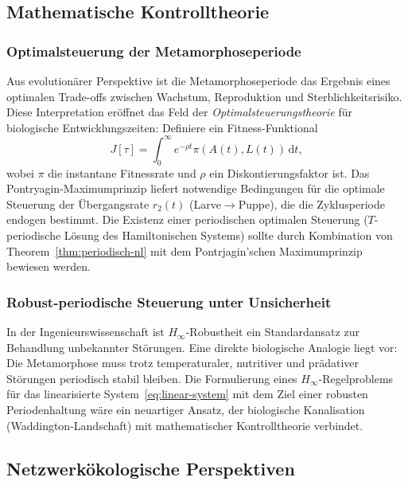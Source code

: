 ﻿\documentclass[12pt, a4paper]{article}
\theoremstyle{definition}
\newcommand{\dd}{\mathrm{d}}
\begin{document}
\subsection{Mathematische Kontrolltheorie}

\subsubsection{Optimalsteuerung der Metamorphoseperiode}
Aus evolutionärer Perspektive ist die Metamorphoseperiode das Ergebnis eines
optimalen Trade-offs zwischen Wachstum, Reproduktion und Sterblichkeitsrisiko.
Diese Interpretation eröffnet das Feld der \emph{Optimalsteuerungstheorie} für
biologische Entwicklungszeiten: Definiere ein Fitness-Funktional
\[
  J[\tau] = \int_0^\infty e^{-\rho t} \pi(A(t), L(t))\,\dd t,
\]
wobei $\pi$ die instantane Fitnessrate und $\rho$ ein Diskontierungsfaktor ist.
Das Pontryagin-Maximumprinzip liefert notwendige Bedingungen für die optimale
Steuerung der Übergangsrate $r_2(t)$ (Larve$\to$Puppe), die die Zyklusperiode
endogen bestimmt. Die Existenz einer periodischen optimalen Steuerung ($T$-periodische
Lösung des Hamiltonischen Systems) sollte durch Kombination von Theorem~\ref{thm:periodisch-nl}
mit dem Pontrjagin'schen Maximumprinzip bewiesen werden.

\subsubsection{Robust-periodische Steuerung unter Unsicherheit}
In der Ingenieurswissenschaft ist $H_\infty$-Robustheit ein Standardansatz zur
Behandlung unbekannter Störungen. Eine direkte biologische Analogie liegt vor:
Die Metamorphose muss trotz temperaturaler, nutritiver und prädativer Störungen
periodisch stabil bleiben. Die Formulierung eines $H_\infty$-Regelproblems für
das linearisierte System~\eqref{eq:linear-system} mit dem Ziel einer
robusten Periodenhaltung wäre ein neuartiger Ansatz, der biologische Kanalisation
(Waddington-Landschaft) mit mathematischer Kontrolltheorie verbindet.

\subsection{Netzwerkökologische Perspektiven}
\end{document}
